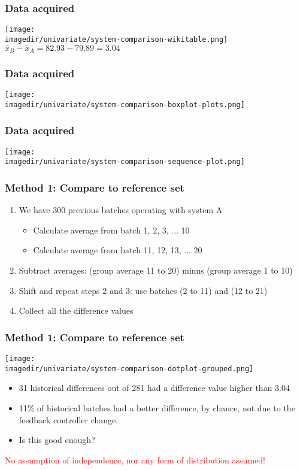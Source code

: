 \begin{frame}\frametitle{Data acquired}
	\texttt{[image: \\imagedir/univariate/system-comparison-wikitable.png]}
	$\bar{x}_B - \bar{x}_A = 82.93 - 79.89 = 3.04$
\end{frame}

\begin{frame}\frametitle{Data acquired}
	\texttt{[image: \\imagedir/univariate/system-comparison-boxplot-plots.png]}
\end{frame}

\begin{frame}\frametitle{Data acquired}
	\texttt{[image: \\imagedir/univariate/system-comparison-sequence-plot.png]}
\end{frame}

\begin{frame}\frametitle{Method 1: Compare to reference set}
	\begin{enumerate}
		\item	We have 300 previous batches operating with system A
		\begin{itemize}
			\item	Calculate average from batch 1, 2, 3, ... 10
			\item	Calculate average from batch 11, 12, 13, ... 20
		\end{itemize}
		\item	Subtract averages: (group average 11 to 20) minus (group average 1 to 10)
		\item	Shift and repeat steps 2 and 3: use batches (2 to 11) and (12 to 21)
		\item	Collect all the difference values
	\end{enumerate}
\end{frame}

\begin{frame}\frametitle{Method 1: Compare to reference set}

	\texttt{[image: \\imagedir/univariate/system-comparison-dotplot-grouped.png]}
	\begin{itemize}
		\item	31 historical differences out of 281 had a difference value higher than 3.04
		\item	11\% of historical batches had a better difference, by chance, not due to the feedback controller change.
		\item	Is this good enough?
	\end{itemize}

	\textcolor{red}{No assumption of independence, nor any form of distribution assumed!}
\end{frame}

